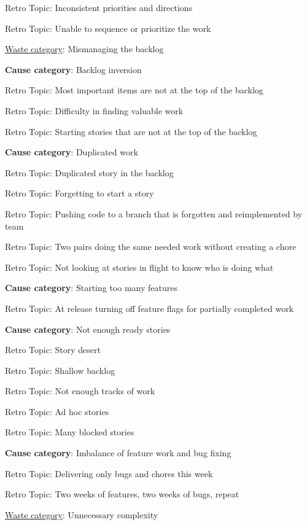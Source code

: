 \quad \quad \quad Retro Topic: Inconsistent priorities and directions

\quad \quad \quad Retro Topic: Unable to sequence or prioritize the work


\underline{Waste category}: Mismanaging the backlog

\quad \textbf{Cause category}: Backlog inversion

\quad \quad Retro Topic: Most important items are not at the top of the backlog

\quad \quad Retro Topic: Difficulty in finding valuable work

\quad \quad Retro Topic: Starting stories that are not at the top of the backlog

\quad \textbf{Cause category}: Duplicated work

\quad \quad Retro Topic: Duplicated story in the backlog

\quad \quad Retro Topic: Forgetting to start a story

\quad \quad Retro Topic: Pushing code to a branch that is forgotten and reimplemented by team

\quad \quad Retro Topic: Two pairs doing the same needed work without creating a chore

\quad \quad Retro Topic: Not looking at stories in flight to know who is doing what

\quad \textbf{Cause category}: Starting too many features

\quad \quad Retro Topic: At release turning off feature flags for partially completed work

\quad \textbf{Cause category}: Not enough ready stories

\quad \quad Retro Topic: Story desert

\quad \quad Retro Topic: Shallow backlog

\quad \quad Retro Topic: Not enough tracks of work

\quad \quad Retro Topic: Ad hoc stories

\quad \quad Retro Topic: Many blocked stories

\quad \textbf{Cause category}: Imbalance of feature work and bug fixing

\quad \quad Retro Topic: Delivering only bugs and chores this week

\quad \quad Retro Topic: Two weeks of features, two weeks of bugs, repeat




\underline{Waste category}: Unnecessary complexity

